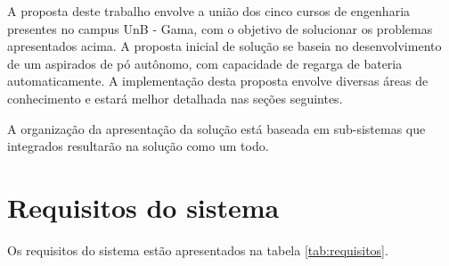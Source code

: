 
A proposta deste trabalho envolve a união dos cinco cursos de engenharia presentes no campus UnB - Gama, com o objetivo de solucionar os problemas apresentados acima. A proposta inicial de solução se baseia no desenvolvimento de um aspirados de pó autônomo, com capacidade de regarga de bateria automaticamente. A implementação desta proposta envolve diversas áreas de conhecimento e estará melhor detalhada nas seções seguintes.

A organização da apresentação da solução está baseada em sub-sistemas que integrados resultarão na solução como um todo. 

\section{Requisitos do sistema} %
\label{sub:requisitos_do_sistema}

Os requisitos do sistema estão apresentados na tabela \ref{tab:requisitos}.

